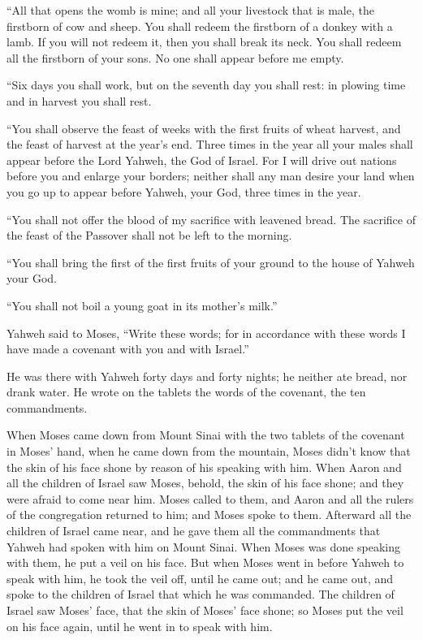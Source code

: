  ``All that opens the womb is mine; and all your
livestock that is male, the firstborn of cow and sheep. 
You shall redeem the firstborn of a donkey with a lamb. If you will not
redeem it, then you shall break its neck. You shall redeem all the
firstborn of your sons. No one shall appear before me empty.

 ``Six days you shall work, but on the seventh day you
shall rest: in plowing time and in harvest you shall rest.

 ``You shall observe the feast of weeks with the first
fruits of wheat harvest, and the feast of harvest at the year's end.
 Three times in the year all your males shall appear
before the Lord Yahweh, the God of Israel.  For I will
drive out nations before you and enlarge your borders; neither shall any
man desire your land when you go up to appear before Yahweh, your God,
three times in the year.

 ``You shall not offer the blood of my sacrifice with
leavened bread. The sacrifice of the feast of the Passover shall not be
left to the morning.

 ``You shall bring the first of the first fruits of your
ground to the house of Yahweh your God.

``You shall not boil a young goat in its mother's milk.''

 Yahweh said to Moses, ``Write these words; for in
accordance with these words I have made a covenant with you and with
Israel.''

 He was there with Yahweh forty days and forty nights; he
neither ate bread, nor drank water. He wrote on the tablets the words of
the covenant, the ten commandments.

 When Moses came down from Mount Sinai with the two
tablets of the covenant in Moses' hand, when he came down from the
mountain, Moses didn't know that the skin of his face shone by reason of
his speaking with him.  When Aaron and all the children
of Israel saw Moses, behold, the skin of his face shone; and they were
afraid to come near him.  Moses called to them, and Aaron
and all the rulers of the congregation returned to him; and Moses spoke
to them.  Afterward all the children of Israel came near,
and he gave them all the commandments that Yahweh had spoken with him on
Mount Sinai.  When Moses was done speaking with them, he
put a veil on his face.  But when Moses went in before
Yahweh to speak with him, he took the veil off, until he came out; and
he came out, and spoke to the children of Israel that which he was
commanded.  The children of Israel saw Moses' face, that
the skin of Moses' face shone; so Moses put the veil on his face again,
until he went in to speak with him.

